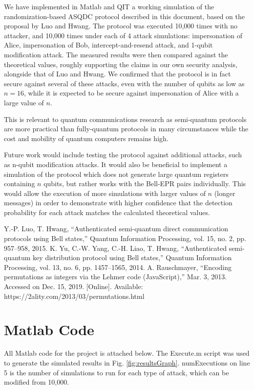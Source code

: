 \documentclass[conference,compsoc]{IEEEtran}
\begin{document}
We have implemented in Matlab and QIT a working simulation of the
randomization-based ASQDC protocol
described in this document, based on the proposal by Luo and Hwang.
The protocol was executed 10,000 times with no attacker, and 10,000 times under
each of 4 attack simulations: impersonation of Alice, impersonation of Bob, intercept-and-resend
attack, and 1-qubit modification attack. The measured results were
then compared against the theoretical values, roughly supporting the claims
in our own security analysis, alongside that of Luo and Hwang.
We confirmed that the protocol is in fact secure against several of these
attacks, even with the number of qubits as low as $n=16$, while it is expected to be
secure against impersonation of Alice with a large value of $n$.

This is relevant to quantum communications research as semi-quantum protocols
are more practical than fully-quantum protocols in many
circumstances while the cost and mobility of quantum computers remains high.

Future work would include testing the protocol against additional
attacks, such as n-qubit modification attacks. It would also be beneficial
to implement a simulation of the protocol which does not generate large quantum registers
containing $n$ qubits, but rather works with the Bell-EPR pairs individually.
This would allow the execution of more simulations with larger values of $n$ (longer messages)
in order to demonstrate with higher confidence that the detection probability for each attack
matches the calculated theoretical values.

\begin{thebibliography}{00}
 Y.-P. Luo, T. Hwang, ``Authenticated semi-quantum direct communication protocols using Bell states,'' Quantum Information Processing, vol. 15, no. 2, pp. 957--958, 2015.
 K. Yu, C.-W. Yang, C.-H. Liao, T. Hwang, ``Authenticated semi-quantum key distribution protocol using Bell states,'' Quantum Information Processing, vol. 13, no. 6, pp. 1457--1565, 2014.
 A. Rauschmayer, ``Encoding permutations as integers via the Lehmer code (JavaScript),'' Mar. 3, 2013. Accessed on Dec. 15, 2019. [Online]. Available: https://2ality.com/2013/03/permutations.html
\end{thebibliography}
\vspace{12pt}

\appendix
\section{Matlab Code}
All Matlab code for the project is attached below. The {\ttfamily Execute.m} script was used to generate the simulated results in Fig. \ref{fig:resultsGraph}.
{\ttfamily numExecutions} on line 5 is the number of simulations to run for each type of attack, which can be modified from 10,000.
\end{document}
